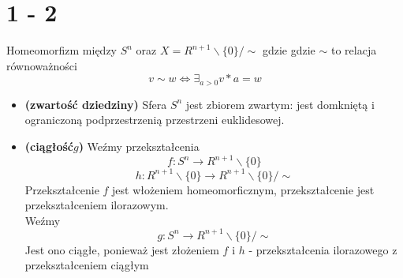 \section*{1 - 2}

Homeomorfizm między $S^n$ oraz $ X = R^{n+1} \backslash \{0\} / \sim $ gdzie gdzie $\sim$ to relacja równoważności $$ v \sim w \iff \exists_{a > 0} v * a = w $$
\begin{itemize}

\item \textbf{(zwartość dziedziny)} Sfera $ S^n $ jest zbiorem zwartym: jest domkniętą i ograniczoną podprzestrzenią przestrzeni euklidesowej.\\

\item \textbf{(ciągłość$g$)} Weźmy przekształcenia 
$$
f: S^n \rightarrow R^{n+1} \backslash \{0\}
$$
$$
h: R^{n+1} \backslash \{0\} \rightarrow R^{n+1} \backslash \{0\} / \sim 
$$
Przekształcenie $f$ jest włożeniem homeomorficznym, przekształcenie jest przekształceniem ilorazowym.
\\
Weźmy 
$$ g: S^n \rightarrow R^{n+1} \backslash \{0\} / \sim $$
Jest ono ciągłe, ponieważ jest złożeniem $f$ i $h$ - przekształcenia ilorazowego z przekształceniem ciągłym\\
\end{itemize}


